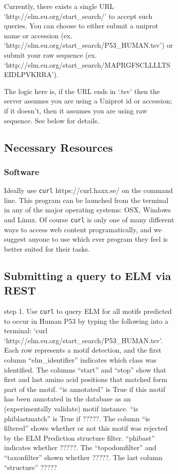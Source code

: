 {\begin{figure}[h!]
{{\begin{figure}[h!]
{{Currently, there exists a single URL `http://elm.eu.org/start\_search/'
to accept such queries. You can choose to either submit a uniprot name
or accession (ex. `http://elm.eu.org/start\_search/P53\_HUMAN.tsv') or
submit your raw sequence (ex.
`http://elm.eu.org/start\_search/MAPRGFSCLLLLTSEIDLPVKRRA').

The logic here is, if the URL ends in `.tsv' then the server assumes you
are using a Uniprot id or accession; if it doesn't, then it assumes you
are using raw sequence. See below for details.

\subsection{Necessary Resources}\label{necessary-resources-2}

\subsubsection{Software}\label{software}

Ideally use \texttt{curl} https://curl.haxx.se/ on the command line.
This program can be launched from the terminal in any of the major
operating systems: OSX, Windows and Linux. Of course \texttt{curl} is
only one of many different ways to access web content programatically,
and we suggest anyone to use which ever program they feel is better
suited for their tasks.

\subsection{Submitting a query to ELM via
REST}\label{submitting-a-query-to-elm-via-rest}

step 1. Use \texttt{curl} to query ELM for all motifs predicted to occur
in Human P53 by typing the following into a terminal: `curl
`http://elm.eu.org/start\_search/P53\_HUMAN.tsv'. Each row represents a
motif detection, and the first column ``elm\_identifier'' indicates
which class was identified. The columns ``start'' and ``stop'' show that
first and last amino acid positions that matched form part of the motif.
``is annotated'' is True if this motif has been annotated in the
database as an (experimentally validate) motif instance. ``is
phiblastmatch'' is True if ?????. The column ``is filtered'' shows
whether or not this motif was rejected by the ELM Prediction structure
filter. ``phibast'' indicates whether ?????. The ``topodomfilter'' and
``taxonfilter'' shown whether ?????. The last column ``structure'' ?????

}}
\end{figure}}}
\end{figure}}
